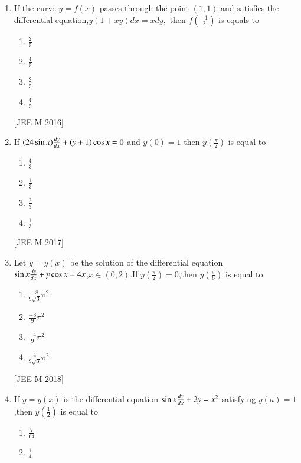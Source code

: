 \documentclass[journal,12pt,twocolumn]{IEEEtran}
\theoremstyle{remark}
\begin{document}
\begin{enumerate}
\item If the curve $ y=f(x)$ passes through the point $ (1,1)$ and satisfies the differential equation,$ y(1+xy)d{x}=xd{y},$ then $ f(\frac{-1}{2})$ is equals to 
\begin{enumerate}
\item $ \frac{2}{5}$



\item $ \frac{4}{5}$



\item $ \frac{2}{5}$



\item $ \frac{4}{5}$


\end{enumerate}

\hfill
{[JEE M 2016]}

\item If $ (24 \sin{x})\frac{d{y}}{d{x}}+ (y+1)\cos{x}=0$ and $y(0)=1$ then $y(\frac{\pi}{2})$ is equal to
\begin{enumerate}
    \item $\frac{4}{3}$
    \item $\frac{1}{3}$
    \item $\frac{2}{3}$
    \item $\frac{1}{3}$
    
\end{enumerate}
\hfill
{[JEE M 2017]}


\item Let $ y=y(x)$ be the solution of the differential equation $\sin{x}\frac{d{y}}{d{x}}+y\cos{x}=4x$,$x\in(0,2)$.If $y(\frac{\pi}{2})=0$,then $y(\frac{\pi}{6})$ is equal to
\begin{enumerate}
    \item $ \frac{-8}{9\sqrt{3}}\pi^2$
    \item $ \frac{-8}{9}\pi^2$
    \item $\frac{-4}{9}\pi^2$
    \item $ \frac{4}{9\sqrt{3}}\pi^2 $
\end{enumerate}
\hfill
{[JEE M 2018]}
\item If $ y=y(x)$ is the differential equation $ \sin{x}\frac{d{y}}{d{x}}+2y=x^2$ satisfying $y(a)=1$,then $y(\frac{1}{2})$ is equal to
\begin{enumerate}
    \item $ \frac{7}{64}$

    
    \item $ \frac{1}{4}$


\end{enumerate}
\end{enumerate}
\end{document}
